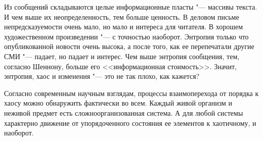 \documentclass[referat, times]{SCWorks}
\begin{document}
Из сообщений складываются целые информационные пласты "--- массивы текста. И чем выше их неопределенность, тем больше ценность. В деловом письме непредсказуемости очень мало, но мало и интереса для читателя. В хорошем художественном произведении "--- с точностью наоборот. Энтропия только что опубликованной новости очень высока, а после того, как ее перепечатали другие СМИ "--- падает, но падает и интерес. Чем выше энтропия сообщения, тем, согласно Шеннону, больше его <<информационная стоимость>>. Значит, энтропия, хаос и изменения "--- это не так плохо, как кажется\cite{vved}?



\conclusion
Согласно современным научным взглядам, процессы взаимоперехода от порядка к хаосу можно обнаружить фактически во всем. Каждый живой организм и неживой предмет есть сложноорганизованная система. А для любой системы характерно движение от упорядоченного состояния ее элементов к хаотичному, и наоборот\cite{zakl}.

\nocite{*}




\appendix
\end{document}
